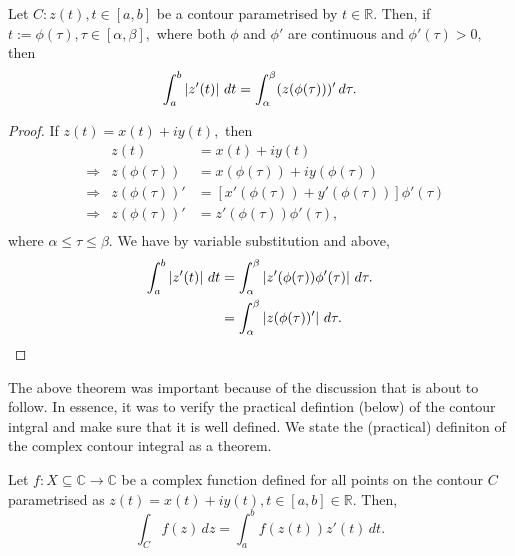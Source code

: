 \documentclass[12pt]{book}
\begin{document}
\begin{thm}
    Let $C: z(t), t \in [a, b]$ be a contour parametrised by $t \in \mathbb{R}.$ Then, if $t := \phi(\tau), \tau \in [\alpha, \beta],$ where both $\phi$ and $\phi'$ are continuous and $\phi'(\tau) > 0,$ then 
    \[
        \int_{a}^{b} \left\lvert z'(t) \right\rvert\,dt = \int_{\alpha}^{\beta} (z(\phi(\tau)))'\,d\tau.
    \]
\end{thm}
\begin{proof}
    If $z(t) = x(t) + iy(t),$ then
    \begin{align*}
        &&z(t) 
            &=
                x(t) + iy(t) \\
        &\Rightarrow &z(\phi(\tau)) 
            &= 
                x(\phi(\tau)) + iy(\phi(\tau)) \\
        &\Rightarrow &z(\phi(\tau))'
            &=
                [x'(\phi(\tau)) + y'(\phi(\tau))]\phi'(\tau) \\
        &\Rightarrow &z(\phi(\tau))'
            &=
                z'(\phi(\tau))\phi'(\tau), \\
    \end{align*}
    where $\alpha \leq \tau \leq \beta.$ We have by variable substitution and above,
    \begin{align*}
        \int_{a}^{b} \left\lvert z'(t) \right\rvert\,dt
            &=
                \int_{\alpha}^{\beta} \left\lvert z'(\phi(\tau))\phi'(\tau) \right\rvert\,d\tau. \\
            &=
                \int_{\alpha}^{\beta} \left\lvert z(\phi(\tau))' \right\rvert\,d\tau. \\
    \end{align*}
\end{proof}
The above theorem was important because of the discussion that is about to follow. In essence, it was to verify the practical defintion (below) of the contour intgral and make sure that it is well defined. We state the (practical) definiton of the complex contour integral as a theorem. 
\begin{thm}
    Let $f: X \subseteq \mathbb{C} \rightarrow \mathbb{C}$ be a complex function defined for all points on the contour $C$ parametrised as $z(t) = x(t) + iy(t), t \in [a, b] \in \mathbb{R}.$ Then,
    \[
        \int_{C} f(z)\,dz = \int_{a}^{b} f(z(t))z'(t)\,dt.
    \]
\end{thm}
\end{document}
